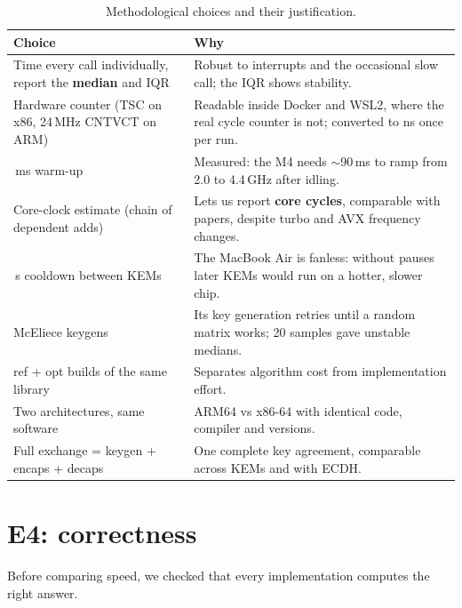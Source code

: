\documentclass[10.5pt,a4paper]{article}
\newcommand{\sect}[1]{\section{#1}}
\newcommand{\key}[1]{\textbf{#1}}
\begin{document}
\begin{table}[H]
\centering\small
\begin{tabularx}{\linewidth}{@{}>{\raggedright\arraybackslash}p{4.2cm}>{\raggedright\arraybackslash}X@{}}
\toprule
Choice & Why \\
\midrule
Time every call individually, report the \key{median} and IQR & Robust to interrupts and the occasional slow call; the IQR shows stability. \\
Hardware counter (TSC on x86, 24\,MHz CNTVCT on ARM) & Readable inside Docker and WSL2, where the real cycle counter is not; converted to ns once per run. \\
200\,ms warm-up & Measured: the M4 needs $\sim$90\,ms to ramp from 2.0 to 4.4\,GHz after idling. \\
Core-clock estimate (chain of dependent adds) & Lets us report \key{core cycles}, comparable with papers, despite turbo and AVX frequency changes. \\
30\,s cooldown between KEMs & The MacBook Air is fanless: without pauses later KEMs would run on a hotter, slower chip. \\
100 McEliece keygens & Its key generation retries until a random matrix works; 20 samples gave unstable medians. \\
ref + opt builds of the same library & Separates algorithm cost from implementation effort. \\
Two architectures, same software & ARM64 vs x86-64 with identical code, compiler and versions. \\
Full exchange = keygen + encaps + decaps & One complete key agreement, comparable across KEMs and with ECDH. \\
\bottomrule
\end{tabularx}
\caption{Methodological choices and their justification.}
\end{table}

\sect{E4: correctness}
Before comparing speed, we checked that every implementation computes the right answer.
\end{document}
